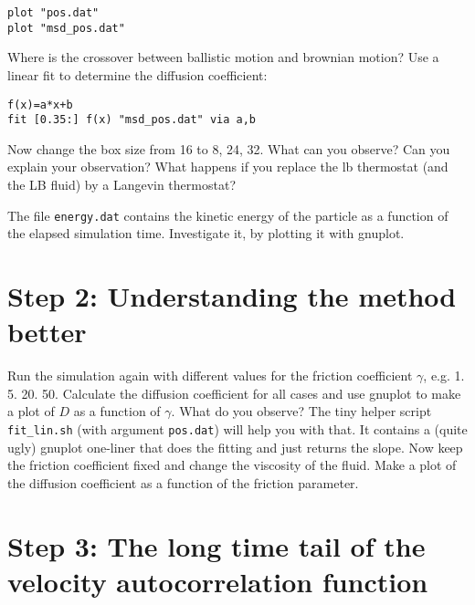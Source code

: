 {\vspace{0,2cm}\small
\begin{lstlisting}[numbers=none]
plot "pos.dat"
plot "msd_pos.dat"
\end{lstlisting}\vspace{0,2cm}
}

Where is the crossover between ballistic motion and brownian motion?
Use a linear fit to determine the diffusion coefficient:
{\vspace{0,2cm}\small
\begin{lstlisting}[numbers=none]
f(x)=a*x+b
fit [0.35:] f(x) "msd_pos.dat" via a,b
\end{lstlisting}\vspace{0,2cm}
}

Now change the box size from 16 to 8, 24, 32. What can you observe?
Can you explain your observation?
What happens if you replace the lb thermostat (and the LB fluid)
by a Langevin thermostat?

The file \lstinline|energy.dat| contains the kinetic energy of the
particle as a function of the elapsed simulation time. Investigate
it, by plotting it with gnuplot. 

\section{Step 2: Understanding the method better}
Run the simulation again with different values for the friction
coefficient $\gamma$, e.g. 1. 5. 20. 50. Calculate the diffusion
coefficient for all cases and use gnuplot to make a plot of $D$ as a
function of $\gamma$. What do you observe?  The tiny helper script
\lstinline|fit_lin.sh| (with argument \lstinline|pos.dat|) will help
you with that. It contains a (quite ugly) gnuplot one-liner that does
the fitting and just returns the slope. Now keep the friction
coefficient fixed and change the viscosity of the fluid. Make a plot
of the diffusion coefficient as a function of the friction parameter.

\section{Step 3: The long time tail of the velocity autocorrelation function}

